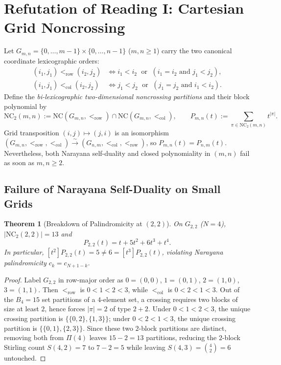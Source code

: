 \documentclass[11pt]{article}
\theoremstyle{plain}
\newtheorem{theorem}{Theorem}[section]
\theoremstyle{definition}
\newcommand{\NC}{\mathrm{NC}}
\begin{document}
\section{Refutation of Reading I: Cartesian Grid Noncrossing}

Let $G_{m,n} = \{0, \dots, m-1\} \times \{0, \dots, n-1\}$ ($m, n \ge 1$) carry the two canonical coordinate lexicographic orders:
\begin{align*}
  (i_1, j_1) <_{\mathrm{row}} (i_2, j_2) &\iff i_1 < i_2 \;\text{ or }\; (i_1 = i_2 \text{ and } j_1 < j_2), \\
  (i_1, j_1) <_{\mathrm{col}} (i_2, j_2) &\iff j_1 < j_2 \;\text{ or }\; (j_1 = j_2 \text{ and } i_1 < i_2).
\end{align*}
Define the \emph{bi-lexicographic two-dimensional noncrossing partitions} and their block polynomial by
\[
  \NC_2(m, n) := \NC(G_{m,n}, <_{\mathrm{row}}) \cap \NC(G_{m,n}, <_{\mathrm{col}}), \qquad
  P_{m,n}(t) := \sum_{\pi \in \NC_2(m, n)} t^{|\pi|}.
\]
Grid transposition $(i, j) \mapsto (j, i)$ is an isomorphism $(G_{m,n}, <_{\mathrm{row}}, <_{\mathrm{col}}) \xrightarrow{\sim} (G_{n,m}, <_{\mathrm{col}}, <_{\mathrm{row}})$, so $P_{m,n}(t) = P_{n,m}(t)$. Nevertheless, both Narayana self-duality and closed polynomiality in $(m, n)$ fail as soon as $m, n \ge 2$.

\subsection{Failure of Narayana Self-Duality on Small Grids}

\begin{theorem}[Breakdown of Palindromicity at $(2, 2)$]\label{thm:grid-22}
On $G_{2,2}$ ($N = 4$), $|\NC_2(2, 2)| = 13$ and
\[
  P_{2,2}(t) = t + 5t^2 + 6t^3 + t^4.
\]
In particular, $[t^2] P_{2,2}(t) = 5 \ne 6 = [t^3] P_{2,2}(t)$, violating Narayana palindromicity $c_k = c_{N+1-k}$.
\end{theorem}
\begin{proof}
Label $G_{2,2}$ in row-major order as $0 = (0,0)$, $1 = (0,1)$, $2 = (1,0)$, $3 = (1,1)$. Then $<_{\mathrm{row}}$ is $0 < 1 < 2 < 3$, while $<_{\mathrm{col}}$ is $0 < 2 < 1 < 3$. Out of the $B_4 = 15$ set partitions of a $4$-element set, a crossing requires two blocks of size at least $2$, hence forces $|\pi| = 2$ of type $2 + 2$. Under $0 < 1 < 2 < 3$, the unique crossing partition is $\{\{0, 2\}, \{1, 3\}\}$; under $0 < 2 < 1 < 3$, the unique crossing partition is $\{\{0, 1\}, \{2, 3\}\}$. Since these two $2$-block partitions are distinct, removing both from $\Pi(4)$ leaves $15 - 2 = 13$ partitions, reducing the $2$-block Stirling count $S(4, 2) = 7$ to $7 - 2 = 5$ while leaving $S(4, 3) = \binom{4}{2} = 6$ untouched.
\end{proof}
\end{document}

